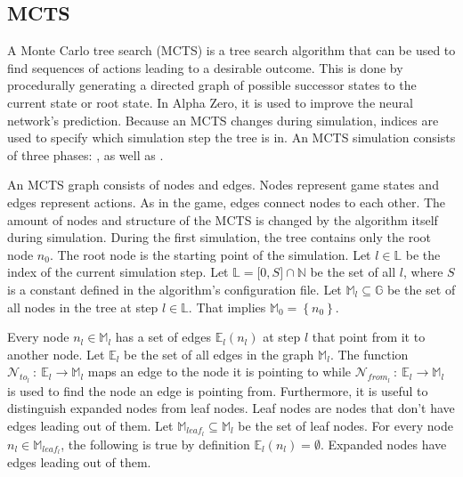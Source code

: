 \documentclass[12pt]{article}
\begin{document}
\subsection{MCTS \cite{chaslot2008parallel}\cite{silver2018general}}
A Monte Carlo tree search (MCTS) is a tree search algorithm that can be used to find sequences of actions leading to a desirable outcome. This is done by procedurally generating a directed graph of possible successor states to the current state or root state. In Alpha Zero, it is used to improve the neural network's prediction.
Because an MCTS changes during simulation, indices are used to specify which simulation step the tree is in. An MCTS simulation consists of three phases: ,  as well as .

An MCTS graph consists of nodes and edges. Nodes represent game states and edges represent actions. As in the game, edges connect nodes to each other.
The amount of nodes and structure of the MCTS is changed by the algorithm itself during simulation. During the first simulation, the tree contains only the root node \(n_0\). The root node is the starting point of the simulation. Let \(l \in \mathbb L\) be the index of the current simulation step. Let \(\mathbb L = \mathbb [0, S]\cap\mathbb N\) be the set of all \(l\), where \(S\) is a constant defined in the algorithm's configuration file. Let \(\mathbb{M}_l \subseteq \mathbb{G}\) be the set of all nodes in the tree at step \(l\in\mathbb L\). That implies \(\mathbb M_0 = \left\{n_0\right\}\).

 Every node \(n_l \in \mathbb{M}_l\) has a set of edges \(\mathbb{E}_l(n_l)\) at step \(l\) that point from it to another node. Let \(\mathbb{E}_l\) be the set of all edges in the graph \(\mathbb M_l\). The function \(\mathcal{N}_{to_l}~:~\mathbb{E}_{l}\to\mathbb{M}_l\) maps an edge to the node it is pointing to while \(\mathcal{N}_{from_l}~:~\mathbb{E}_{l}\to\mathbb{M}_l\) is used to find the node an edge is pointing from.
Furthermore, it is useful to distinguish expanded nodes from leaf nodes. Leaf nodes are nodes that don't have edges leading out of them. Let \(\mathbb{M}_{leaf_l} \subseteq \mathbb{M}_l\) be the set of leaf nodes. For every node \(n_l\in \mathbb{M}_{leaf_l}\), the following is true by definition \(\mathbb{E}_l(n_l) = \emptyset\). Expanded nodes have edges leading out of them.
\end{document}
